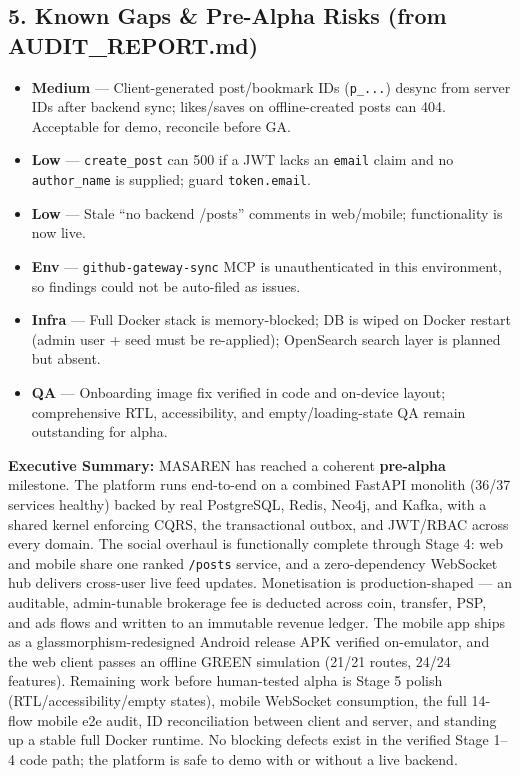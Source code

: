 \documentclass[11pt,a4paper]{article}
\newcommand{\gap}[1]{\textcolor{masarenred}{\bfseries #1}}
\newcommand{\code}[1]{\texttt{#1}}
\begin{document}
\subsection*{5. Known Gaps \& Pre-Alpha Risks (from AUDIT\_REPORT.md)}
\begin{itemize}[leftmargin=1.4em,itemsep=1pt,topsep=2pt]
  \item \gap{Medium} --- Client-generated post/bookmark IDs (\code{p\_...}) desync from server IDs after backend sync; likes/saves on offline-created posts can 404. Acceptable for demo, reconcile before GA.
  \item \gap{Low} --- \code{create\_post} can 500 if a JWT lacks an \code{email} claim and no \code{author\_name} is supplied; guard \code{token.email}.
  \item \gap{Low} --- Stale ``no backend /posts'' comments in web/mobile; functionality is now live.
  \item \gap{Env} --- \code{github-gateway-sync} MCP is unauthenticated in this environment, so findings could not be auto-filed as issues.
  \item \gap{Infra} --- Full Docker stack is memory-blocked; DB is wiped on Docker restart (admin user + seed must be re-applied); OpenSearch search layer is planned but absent.
  \item \gap{QA} --- Onboarding image fix verified in code and on-device layout; comprehensive RTL, accessibility, and empty/loading-state QA remain outstanding for alpha.
\end{itemize}

\vspace{0.5em}
\begin{minipage}{\textwidth}\small
\textbf{Executive Summary:} MASAREN has reached a coherent \textbf{pre-alpha} milestone. The platform runs end-to-end on a combined FastAPI monolith (36/37 services healthy) backed by real PostgreSQL, Redis, Neo4j, and Kafka, with a shared kernel enforcing CQRS, the transactional outbox, and JWT/RBAC across every domain. The social overhaul is functionally complete through Stage 4: web and mobile share one ranked \code{/posts} service, and a zero-dependency WebSocket hub delivers cross-user live feed updates. Monetisation is production-shaped --- an auditable, admin-tunable brokerage fee is deducted across coin, transfer, PSP, and ads flows and written to an immutable revenue ledger. The mobile app ships as a glassmorphism-redesigned Android release APK verified on-emulator, and the web client passes an offline GREEN simulation (21/21 routes, 24/24 features). Remaining work before human-tested alpha is Stage 5 polish (RTL/accessibility/empty states), mobile WebSocket consumption, the full 14-flow mobile e2e audit, ID reconciliation between client and server, and standing up a stable full Docker runtime. No blocking defects exist in the verified Stage 1--4 code path; the platform is safe to demo with or without a live backend.
\end{minipage}
\end{document}
